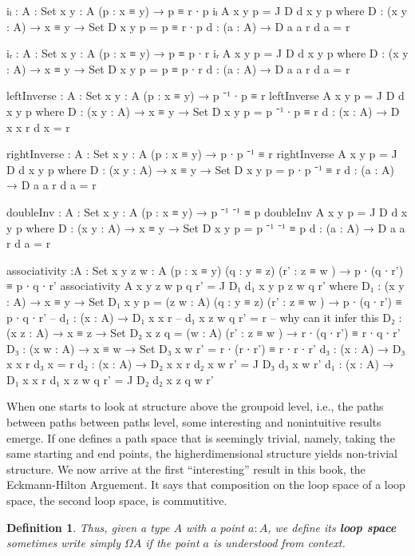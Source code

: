 \documentclass[11pt, a4paper]{article}
\newtheorem{definition}{Definition} \newtheorem{lem}{Lemma}
\newcommand{\define}[1]{\textbf{#1}} \newcommand{\defeq}{\vcentcolon\equiv} %
\newcommand{\id}[3][]{\ensuremath{#2 =_{#1} #3}\xspace}
\begin{document}
\begin{code} iₗ : {A : Set} {x y : A} (p : x ≡ y) → p ≡ r ∙ p iₗ {A} {x} {y} p =
J D d x y p where D : (x y : A) → x ≡ y → Set D x y p = p ≡ r ∙ p d : (a : A) →
D a a r d a = r

  iᵣ : {A : Set} {x y : A} (p : x ≡ y) → p ≡ p ∙ r iᵣ {A} {x} {y} p = J D d x y
p where D : (x y : A) → x ≡ y → Set D x y p = p ≡ p ∙ r d : (a : A) → D a a r d
a = r

  leftInverse : {A : Set} {x y : A} (p : x ≡ y) → p ⁻¹ ∙ p ≡ r leftInverse {A}
{x} {y} p = J D d x y p where D : (x y : A) → x ≡ y → Set D x y p = p ⁻¹ ∙ p ≡ r
d : (x : A) → D x x r d x = r

  rightInverse : {A : Set} {x y : A} (p : x ≡ y) → p ∙ p ⁻¹ ≡ r rightInverse {A}
{x} {y} p = J D d x y p where D : (x y : A) → x ≡ y → Set D x y p = p ∙ p ⁻¹ ≡ r
d : (a : A) → D a a r d a = r

  doubleInv : {A : Set} {x y : A} (p : x ≡ y) → p ⁻¹ ⁻¹ ≡ p doubleInv {A} {x}
{y} p = J D d x y p where D : (x y : A) → x ≡ y → Set D x y p = p ⁻¹ ⁻¹ ≡ p d :
(a : A) → D a a r d a = r

  associativity :{A : Set} {x y z w : A} (p : x ≡ y) (q : y ≡ z) (r' : z ≡ w ) →
p ∙ (q ∙ r') ≡ p ∙ q ∙ r' associativity {A} {x} {y} {z} {w} p q r' = J D₁ d₁ x y
p z w q r' where D₁ : (x y : A) → x ≡ y → Set D₁ x y p = (z w : A) (q : y ≡ z)
(r' : z ≡ w ) → p ∙ (q ∙ r') ≡ p ∙ q ∙ r' -- d₁ : (x : A) → D₁ x x r -- d₁ x z w
q r' = r -- why can it infer this D₂ : (x z : A) → x ≡ z → Set D₂ x z q = (w :
A) (r' : z ≡ w ) → r ∙ (q ∙ r') ≡ r ∙ q ∙ r' D₃ : (x w : A) → x ≡ w → Set D₃ x w
r' = r ∙ (r ∙ r') ≡ r ∙ r ∙ r' d₃ : (x : A) → D₃ x x r d₃ x = r d₂ : (x : A) →
D₂ x x r d₂ x w r' = J D₃ d₃ x w r' d₁ : (x : A) → D₁ x x r d₁ x z w q r' = J D₂
d₂ x z q w r'

\end{code}

When one starts to look at structure above the groupoid level, i.e., the paths
between paths between paths level, some interesting and nonintuitive results
emerge. If one defines a path space that is seemingly trivial, namely, taking
the same starting and end points, the higherdimensional structure yields
non-trivial structure. We now arrive at the first ``interesting'' result in this
book, the Eckmann-Hilton Arguement. It says that composition on the loop space
of a loop space, the second loop space, is commutitive.



\begin{definition}

Thus, given a type $A$ with a point $a:A$, we define its \define{loop space}
sometimes write simply $\Omega A$ if the point $a$ is understood from context.

\end {definition}
\end{document}
